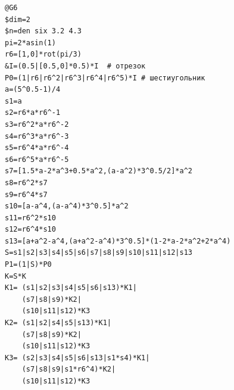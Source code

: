 \documentclass[a4paper,14pt]{extarticle} %
\newcommand{\0}{\varnothing}
\newcommand{\8}{\infty}
\theoremstyle{definition}
\begin{document}
\begin{lstlisting}[name=aifs,label=list:prev,caption=Код примера \ref{ex:5}]
@G6
$dim=2
$n=den six 3.2 4.3 
pi=2*asin(1)
r6=[1,0]*rot(pi/3)
&I=(0.5|[0.5,0]*0.5)*I  # отрезок
P0=(1|r6|r6^2|r6^3|r6^4|r6^5)*I # шестиугольник
a=(5^0.5-1)/4
s1=a
s2=r6*a*r6^-1
s3=r6^2*a*r6^-2
s4=r6^3*a*r6^-3
s5=r6^4*a*r6^-4
s6=r6^5*a*r6^-5
s7=[1.5*a-2*a^3+0.5*a^2,(a-a^2)*3^0.5/2]*a^2
s8=r6^2*s7
s9=r6^4*s7
s10=[a-a^4,(a-a^4)*3^0.5]*a^2
s11=r6^2*s10
s12=r6^4*s10
s13=[a+a^2-a^4,(a+a^2-a^4)*3^0.5]*(1-2*a-2*a^2+2*a^4)
S=s1|s2|s3|s4|s5|s6|s7|s8|s9|s10|s11|s12|s13
P1=(1|S)*P0
K=S*K
K1= (s1|s2|s3|s4|s5|s6|s13)*K1|
    (s7|s8|s9)*K2|
	(s10|s11|s12)*K3
K2= (s1|s2|s4|s5|s13)*K1|
    (s7|s8|s9)*K2|
	(s10|s11|s12)*K3
K3= (s2|s3|s4|s5|s6|s13|s1*s4)*K1|
    (s7|s8|s9|s1*r6^4)*K2|
	(s10|s11|s12)*K3
\end{lstlisting}
\end{document}
